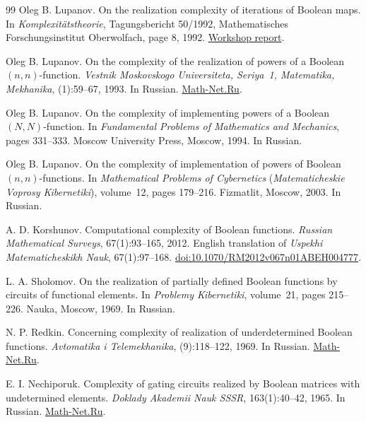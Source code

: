 \documentclass[11pt]{article}
\theoremstyle{definition}
\theoremstyle{remark}
\numberwithin{equation}{section}
\begin{document}
\begin{thebibliography}{99}
Oleg B. Lupanov.
\newblock On the realization complexity of iterations of Boolean maps.
\newblock In \emph{Komplexit\"atstheorie}, Tagungsbericht 50/1992,
Mathematisches Forschungsinstitut Oberwolfach, page 8, 1992.
\newblock \href{https://www.wisdom.weizmann.ac.il/~/oded/PS/owr-cc92.pdf}{Workshop report}.

Oleg B. Lupanov.
\newblock On the complexity of the realization of powers of a Boolean
$(n,n)$-function.
\newblock \emph{Vestnik Moskovskogo Universiteta, Seriya~1,
Matematika, Mekhanika}, (1):59--67, 1993. In Russian.
\newblock \href{https://www.mathnet.ru/rus/vmumm2330}{Math-Net.Ru}.

Oleg B. Lupanov.
\newblock On the complexity of implementing powers of a Boolean
$(N,N)$-function.
\newblock In \emph{Fundamental Problems of Mathematics and Mechanics},
pages 331--333. Moscow University Press, Moscow, 1994. In Russian.

Oleg B. Lupanov.
\newblock On the complexity of implementation of powers of Boolean
$(n,n)$-functions.
\newblock In \emph{Mathematical Problems of Cybernetics}
(\emph{Matematicheskie Voprosy Kibernetiki}), volume~12,
pages 179--216. Fizmatlit, Moscow, 2003. In Russian.

A. D. Korshunov.
\newblock Computational complexity of Boolean functions.
\newblock \emph{Russian Mathematical Surveys}, 67(1):93--165, 2012.
English translation of \emph{Uspekhi Matematicheskikh Nauk},
67(1):97--168.
\newblock \href{https://doi.org/10.1070/RM2012v067n01ABEH004777}{doi:10.1070/RM2012v067n01ABEH004777}.

L. A. Sholomov.
\newblock On the realization of partially defined Boolean functions by
circuits of functional elements.
\newblock In \emph{Problemy Kibernetiki}, volume~21, pages 215--226.
Nauka, Moscow, 1969. In Russian.

N. P. Redkin.
\newblock Concerning complexity of realization of underdetermined Boolean functions.
\newblock \emph{Avtomatika i Telemekhanika}, (9):118--122, 1969. In Russian.
\newblock \href{https://www.mathnet.ru/rus/at10369}{Math-Net.Ru}.

E. I. Nechiporuk.
\newblock Complexity of gating circuits realized by Boolean matrices
with undetermined elements.
\newblock \emph{Doklady Akademii Nauk SSSR}, 163(1):40--42, 1965. In Russian.
\newblock \href{https://www.mathnet.ru/rus/dan31288}{Math-Net.Ru}.


\end{thebibliography}
\end{document}
